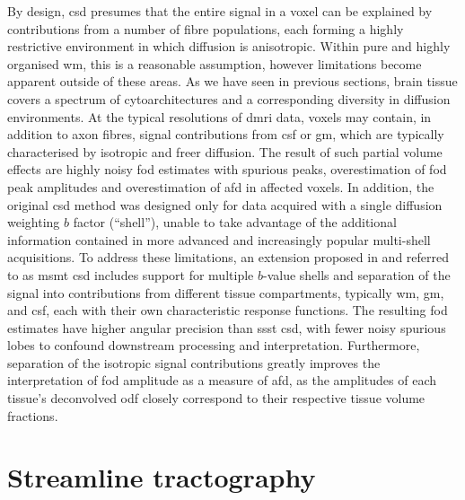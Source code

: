By design, \gls{csd} presumes that the entire signal in a voxel can be explained by contributions from a number of fibre populations, each forming a highly restrictive environment in which diffusion is anisotropic.
Within pure and highly organised \gls{wm}, this is a reasonable assumption, however limitations become apparent outside of these areas.
As we have seen in previous sections, brain tissue covers a spectrum of cytoarchitectures and a corresponding diversity in diffusion environments.
At the typical resolutions of \gls{dmri} data, voxels may contain, in addition to axon fibres, signal contributions from \gls{csf} or \gls{gm}, which are typically characterised by isotropic and freer diffusion.
The result of such partial volume effects are highly noisy \gls{fod} estimates with spurious peaks, overestimation of \gls{fod} peak amplitudes and overestimation of \gls{afd} in affected voxels\autocite{Jeurissen2014}.
In addition, the original \gls{csd} method was designed only for data acquired with a single diffusion weighting $b$ factor (``shell''), unable to take advantage of the additional information contained in more advanced and increasingly popular multi-shell acquisitions.
To address these limitations, an extension proposed in \textcite{Jeurissen2014} and referred to as \gls{msmt} \gls{csd} includes support for multiple $b$-value shells and separation of the signal into contributions from different tissue compartments, typically \gls{wm}, \gls{gm}, and \gls{csf}, each with their own characteristic response functions.
The resulting \gls{fod} estimates have higher angular precision than \gls{ssst} \gls{csd}, with fewer noisy spurious lobes to confound downstream processing and interpretation.
Furthermore, separation of the isotropic signal contributions greatly improves the interpretation of \gls{fod} amplitude as a measure of \gls{afd}, as the amplitudes of each tissue's deconvolved \gls{odf} closely correspond to their respective tissue volume fractions\autocite{Jeurissen2014}.

\section{Streamline tractography}\label{sec:tractography}


